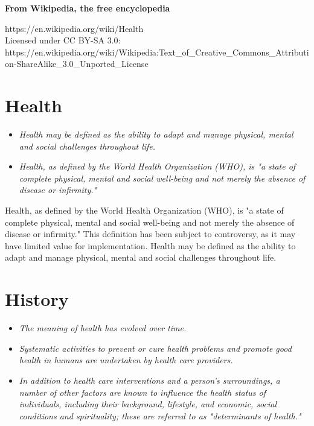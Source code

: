 \textbf{From Wikipedia, the free encyclopedia}

https://en.wikipedia.org/wiki/Health\\
Licensed under CC BY-SA 3.0:\\
https://en.wikipedia.org/wiki/Wikipedia:Text\_of\_Creative\_Commons\_Attribution-ShareAlike\_3.0\_Unported\_License

\section{Health}\label{health}

\begin{itemize}
\item
  \emph{Health may be defined as the ability to adapt and manage
  physical, mental and social challenges throughout life.}
\item
  \emph{Health, as defined by the World Health Organization (WHO), is "a
  state of complete physical, mental and social well-being and not
  merely the absence of disease or infirmity."}
\end{itemize}

Health, as defined by the World Health Organization (WHO), is "a state
of complete physical, mental and social well-being and not merely the
absence of disease or infirmity." This definition has been subject to
controversy, as it may have limited value for implementation. Health may
be defined as the ability to adapt and manage physical, mental and
social challenges throughout life.

\section{History}\label{history}

\begin{itemize}
\item
  \emph{The meaning of health has evolved over time.}
\item
  \emph{Systematic activities to prevent or cure health problems and
  promote good health in humans are undertaken by health care
  providers.}
\item
  \emph{In addition to health care interventions and a person's
  surroundings, a number of other factors are known to influence the
  health status of individuals, including their background, lifestyle,
  and economic, social conditions and spirituality; these are referred
  to as "determinants of health."}
\end{itemize}

